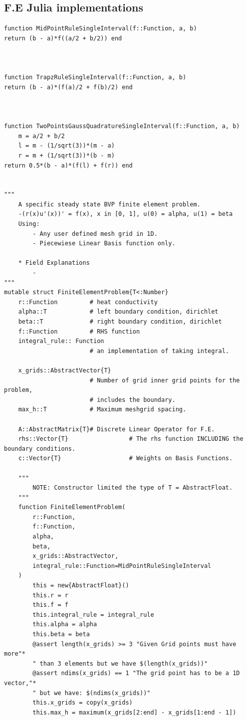 \documentclass[]{article}
\begin{document}
        \subsection*{F.E Julia implementations}\label{THECODE}
            \begin{lstlisting}
function MidPointRuleSingleInterval(f::Function, a, b)
return (b - a)*f((a/2 + b/2)) end



function TrapzRuleSingleInterval(f::Function, a, b)
return (b - a)*(f(a)/2 + f(b)/2) end



function TwoPointsGaussQuadratureSingleInterval(f::Function, a, b)
    m = a/2 + b/2
    l = m - (1/sqrt(3))*(m - a)
    r = m + (1/sqrt(3))*(b - m)
return 0.5*(b - a)*(f(l) + f(r)) end


"""
    A specific steady state BVP finite element problem. 
    -(r(x)u'(x))' = f(x), x in [0, 1], u(0) = alpha, u(1) = beta
    Using:  
        - Any user defined mesh grid in 1D. 
        - Piecewiese Linear Basis function only. 

    * Field Explanations
        - 
"""
mutable struct FiniteElementProblem{T<:Number}
    r::Function         # heat conductivity
    alpha::T            # left boundary condition, dirichlet
    beta::T             # right boundary condition, dirichlet
    f::Function         # RHS function
    integral_rule:: Function
                        # an implementation of taking integral. 

    x_grids::AbstractVector{T}
                        # Number of grid inner grid points for the problem, 
                        # includes the boundary. 
    max_h::T            # Maximum meshgrid spacing. 

    A::AbstractMatrix{T}# Discrete Linear Operator for F.E. 
    rhs::Vector{T}                 # The rhs function INCLUDING the boundary conditions. 
    c::Vector{T}                   # Weights on Basis Functions. 

    """
        NOTE: Constructor limited the type of T = AbstractFloat. 
    """
    function FiniteElementProblem(
        r::Function, 
        f::Function, 
        alpha, 
        beta, 
        x_grids::AbstractVector,
        integral_rule::Function=MidPointRuleSingleInterval
    )
        this = new{AbstractFloat}()
        this.r = r
        this.f = f
        this.integral_rule = integral_rule
        this.alpha = alpha
        this.beta = beta
        @assert length(x_grids) >= 3 "Given Grid points must have more"*
        " than 3 elements but we have $(length(x_grids))"
        @assert ndims(x_grids) == 1 "The grid point has to be a 1D vector,"*
        " but we have: $(ndims(x_grids))"
        this.x_grids = copy(x_grids)
        this.max_h = maximum(x_grids[2:end] - x_grids[1:end - 1])
        

\end{lstlisting}
\end{document}
